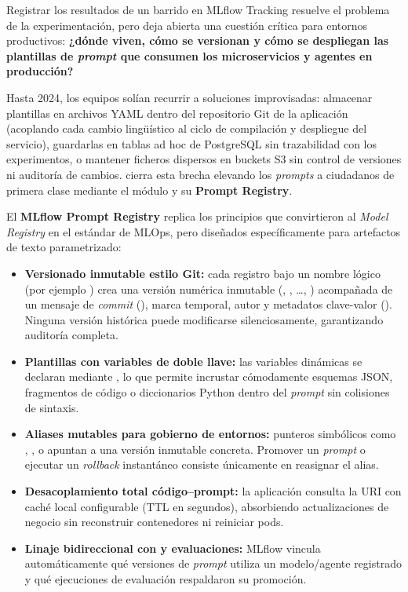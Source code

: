 Registrar los resultados de un barrido en MLflow Tracking resuelve el problema de la experimentación, pero deja abierta una cuestión crítica para entornos productivos: \textbf{¿dónde viven, cómo se versionan y cómo se despliegan las plantillas de \textit{prompt} que consumen los microservicios y agentes en producción?}

Hasta 2024, los equipos solían recurrir a soluciones improvisadas: almacenar plantillas en archivos YAML dentro del repositorio Git de la aplicación (acoplando cada cambio lingüístico al ciclo de compilación y despliegue del servicio), guardarlas en tablas ad hoc de PostgreSQL sin trazabilidad con los experimentos, o mantener ficheros dispersos en buckets S3 sin control de versiones ni auditoría de cambios.  cierra esta brecha elevando los \textit{prompts} a ciudadanos de primera clase mediante el módulo  y su \textbf{Prompt Registry}.

\begin{modernbox}
El \textbf{MLflow Prompt Registry} replica los principios que convirtieron al \textit{Model Registry} en el estándar de MLOps, pero diseñados específicamente para artefactos de texto parametrizado:
\begin{itemize}
  \item \textbf{Versionado inmutable estilo Git:} cada registro bajo un nombre lógico (por ejemplo ) crea una versión numérica inmutable (, , \dots, ) acompañada de un mensaje de \textit{commit} (), marca temporal, autor y metadatos clave-valor (). Ninguna versión histórica puede modificarse silenciosamente, garantizando auditoría completa.
  \item \textbf{Plantillas con variables de doble llave:} las variables dinámicas se declaran mediante , lo que permite incrustar cómodamente esquemas JSON, fragmentos de código o diccionarios Python dentro del \textit{prompt} sin colisiones de sintaxis.
  \item \textbf{Aliases mutables para gobierno de entornos:} punteros simbólicos como , ,  o  apuntan a una versión inmutable concreta. Promover un \textit{prompt} o ejecutar un \textit{rollback} instantáneo consiste únicamente en reasignar el alias.
  \item \textbf{Desacoplamiento total código--prompt:} la aplicación consulta la URI  con caché local configurable (TTL en segundos), absorbiendo actualizaciones de negocio sin reconstruir contenedores ni reiniciar pods.
  \item \textbf{Linaje bidireccional con  y evaluaciones:} MLflow vincula automáticamente qué versiones de \textit{prompt} utiliza un modelo/agente registrado y qué ejecuciones de evaluación respaldaron su promoción.
\end{itemize}
\end{modernbox}

